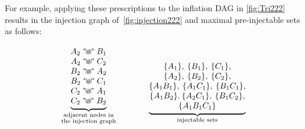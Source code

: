 For example, applying these prescriptions to the inflation DAG in \cref{fig:Tri222} results in the injection graph of~\cref{fig:injection222} and maximal pre-injectable sets as follows:
\begin{align}\label{eq:basicsetup222}
{\underbrace{\begin{matrix}
A_2\aindep B_1\\
A_2\aindep C_2\\
B_2\aindep A_2\\
B_2\aindep C_1\\
C_2\aindep A_1\\
C_2\aindep B_2
\end{matrix}}_{\substack{\text{adjacent nodes in}\\\text{the injection graph}}}}
\qquad\qquad
{\underbrace{\begin{matrix}
\\ \\
\brackets{A_1},\:\brackets{B_1},\:\brackets{C_1},\\
\brackets{A_2},\:\brackets{B_2},\:\brackets{C_2},\\
\brackets{A_1 B_1},\:\brackets{A_1 C_1},\:\brackets{B_1 C_1},\\
\brackets{A_1 B_2}.\:\brackets{A_2 C_1},\:\brackets{B_1 C_2},\\
\brackets{A_1 B_1 C_1}
\end{matrix}}_{\substack{\text{injectable sets}}}}

\end{align}
